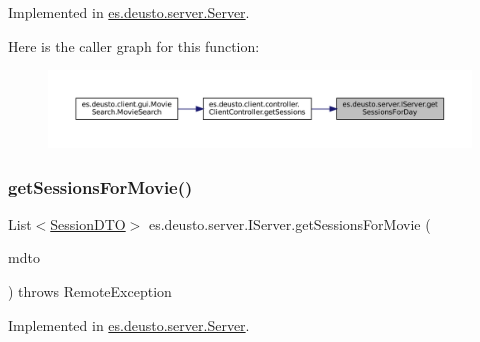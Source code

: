 Implemented in \mbox{\hyperlink{classes_1_1deusto_1_1server_1_1_server_a688ca336b3cbdb5c04ecdc4f23ff65d1}{es.\+deusto.\+server.\+Server}}.

Here is the caller graph for this function\+:
\nopagebreak
\begin{figure}[H]
\begin{center}
\leavevmode
\includegraphics[width=350pt]{interfacees_1_1deusto_1_1server_1_1_i_server_aac50d6a77e30df4d4c15fcaf4ba979f5_icgraph}
\end{center}
\end{figure}
\mbox{\label{interfacees_1_1deusto_1_1server_1_1_i_server_a33dc65de2a567be10bf2477ee28765f8}} 
\subsubsection{\texorpdfstring{getSessionsForMovie()}{getSessionsForMovie()}}
{\footnotesize\ttfamily List$<$\mbox{\hyperlink{classes_1_1deusto_1_1server_1_1data_1_1_session_d_t_o}{Session\+D\+TO}}$>$ es.\+deusto.\+server.\+I\+Server.\+get\+Sessions\+For\+Movie (\begin{DoxyParamCaption}\item[{\mbox{\hyperlink{classes_1_1deusto_1_1server_1_1data_1_1_movie_d_t_o}{Movie\+D\+TO}}}]{mdto }\end{DoxyParamCaption}) throws Remote\+Exception}



Implemented in \mbox{\hyperlink{classes_1_1deusto_1_1server_1_1_server_a33a6671bb4dc4bd9e23df10e53e5632d}{es.\+deusto.\+server.\+Server}}.

\mbox{\label{interfacees_1_1deusto_1_1server_1_1_i_server_a2dcd7f0b0e157eb797e20432c0b0e971}} 
